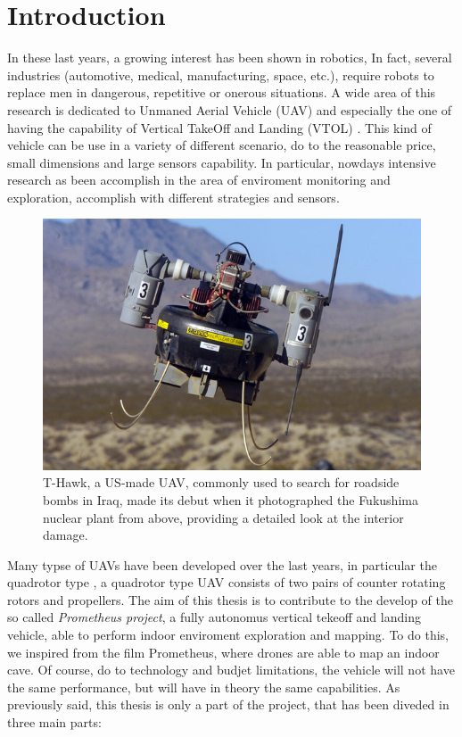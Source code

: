 \chapter{Introduction}
\label{introduction}

\renewcommand{\thepage}{\arabic{page}} 			%
\setcounter{page}{1}                   			%

In these last years, a growing interest has been shown in robotics, In fact, several industries (automotive, medical, manufacturing, space, etc.), require robots to replace men in dangerous, repetitive or onerous situations. A wide area of this research is dedicated to Unmaned Aerial Vehicle (UAV) and especially the one of having the capability of Vertical TakeOff and Landing (VTOL) \cite{largeQuadrotor}. This kind of vehicle can be use in a variety of different scenario, do to the reasonable price, small dimensions and large sensors capability. In particular, nowdays intensive research as been accomplish in the area of enviroment monitoring and exploration, accomplish with different strategies and sensors.

\begin{figure}
	\includegraphics[scale=0.4]{images/fukushima.jpg}
	\caption{T-Hawk, a US-made UAV, commonly used to search for roadside bombs in Iraq, made its debut when it photographed the Fukushima nuclear plant from above, providing a detailed look at the interior damage.}
	\label{fig:application}
\end{figure}  

\noindent Many typse of UAVs have been developed over the last years, in particular the quadrotor type \cite{Aalborg}, a quadrotor type UAV consists of two pairs of counter rotating rotors and propellers. The aim of this thesis is to contribute to the develop of the so called \textit{Prometheus project}, a fully autonomus vertical tekeoff and landing vehicle, able to perform indoor enviroment exploration and mapping. To do this, we inspired from the film Prometheus, where drones are able to map an indoor cave. Of course, do to technology and budjet limitations, the vehicle will not have the same performance, but will have in theory the same capabilities. As previously said, this thesis is only a part of the project, that has been diveded in three main parts:

